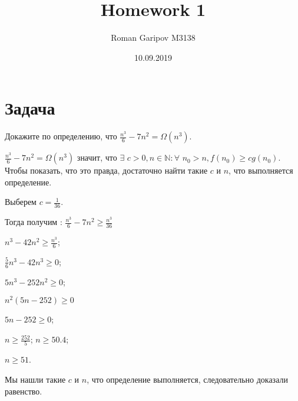 \documentclass{article}
\title{Homework 1}
\date{10.09.2019}
\author{Roman Garipov M3138}
\begin{document}
  \maketitle %
  \newpage %

\section{Задача }
Докажите по определению, что 	$ \frac{n^{3}}{6} - 7n^{2} = \Omega(n^{3})$.
$$$$


   $ \frac{n^{3}}{6} - 7n^{2} = \Omega(n^{3})$ значит, что $ \exists $ $c > 0,  n \in \mathbb{N}: \forall$ $n_{0} > n, f(n_{0}) \geqslant cg(n_{0})$. 
   Чтобы показать, что это правда, достаточно найти такие $c$ и $n$, что выполняется определение. 
\begin{center}
	Выберем $c = \frac{1}{36}$. 
   
   Тогда получим : $ \frac{n^{3}}{6} - 7n^{2} \geqslant \frac{n^{3}}{36} $
   
    $n^{3} - 42n^{2} \geqslant \frac{n^{3}}{6}$; 
    
    $\frac{5}{6}n^{3} - 42n^{3} \geqslant 0$;
    
     $5n^{3} - 252n^{2} \geqslant 0$; 
     
      $n^{2}(5n - 252) \geqslant 0$ 
    
     $5n - 252 \geqslant 0$; 
     
     $n \geqslant \frac{252}{5}$; $ n \geqslant 50.4$; 
     
     $n \geqslant 51$.
\end{center}     
      Мы нашли такие $c$ и $n$, что определение выполняется, следовательно доказали равенство.
      
\end{document}
